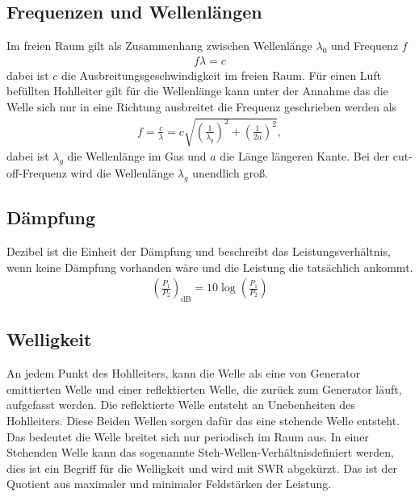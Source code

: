 \subsection{Frequenzen und Wellenlängen}
Im freien Raum gilt als Zusammenhang zwischen Wellenlänge $\lambda_0$ und Frequenz $f$
\begin{align}
	f\lambda=c
\end{align}
dabei ist $c$ die Ausbreitungsgeschwindigkeit im freien Raum. Für einen Luft befüllten Hohlleiter gilt für die Wellenlänge kann unter der Annahme das die Welle sich nur in eine Richtung ausbreitet die Frequenz geschrieben werden als 
\begin{align}
	f=	\frac{c}{\lambda}=c \sqrt{ \left( \frac{1}{\lambda_g} \right)^2 + \left( \frac{1}{2a} \right) ^2 },
\end{align}
dabei ist $\lambda_g$ die Wellenlänge im Gas und $a$ die Länge längeren Kante. Bei der cut-off-Frequenz wird die Wellenlänge $\lambda_g$ unendlich groß.
\subsection{Dämpfung}
Dezibel ist die Einheit der Dämpfung und beschreibt das Leistungsverhältnis, wenn keine Dämpfung vorhanden wäre und die Leistung die tatsächlich ankommt.
\begin{align}
	\left( \frac{P_1}{P_2} \right)_\text{dB}=10\log\left( \frac{P_1}{P_2}\right)
\end{align}

\subsection{Welligkeit}
An jedem Punkt des Hohlleiters, kann die Welle als eine von Generator emittierten Welle und einer reflektierten Welle, die zurück zum Generator läuft, aufgefasst werden. Die reflektierte Welle entsteht an Unebenheiten des Hohlleiters. Diese Beiden Wellen sorgen dafür das eine stehende Welle entsteht. Das bedeutet die Welle breitet sich nur periodisch im Raum aus. In einer Stehenden Welle kann das sogenannte \glqq Steh-Wellen-Verhältnis\grqq definiert werden, dies ist ein Begriff für die Welligkeit und wird mit SWR abgekürzt. Das ist der Quotient aus maximaler und minimaler Feldstärken der Leistung.